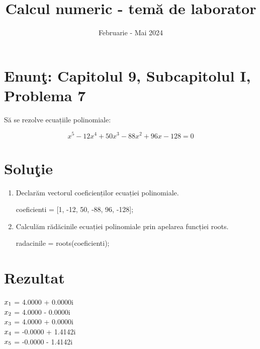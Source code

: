 \documentclass{article}
\begin{document}
\title{Calcul numeric - tem\u{a} de laborator}

\author{}

\date{Februarie - Mai 2024}

\maketitle              %








\section*{Enun\c{t}: Capitolul 9, Subcapitolul I, Problema 7}

S\u{a} se rezolve ecuațiile polinomiale:

\begin{center}
\[
x^5 - 12x^4 + 50x^3 - 88x^2 + 96x - 128 = 0
\]
\end{center}

\section*{Solu\c{t}ie}

\begin{center}
\begin{enumerate}
\item Declarăm vectorul coeficienților ecuației polinomiale. \\
 \begin{center}
    coeficienti = [1, -12, 50, -88, 96, -128];
    \end{center}
\item Calculăm rădăcinile ecuației polinomiale prin apelarea funcției roots. \\
\begin{center}
    radacinile = roots(coeficienti);
    \end{center}
\end{enumerate}
\end{center}

\section*{Rezultat}
\begin{center}
$x\textsubscript{1}$ = 4.0000 + 0.0000i \\
$x\textsubscript{2}$ = 4.0000 - 0.0000i \\
$x\textsubscript{3}$ = 4.0000 + 0.0000i \\
$x\textsubscript{4}$ = -0.0000 + 1.4142i \\
$x\textsubscript{5}$ = -0.0000 - 1.4142i
\end{center}
\end{document}
